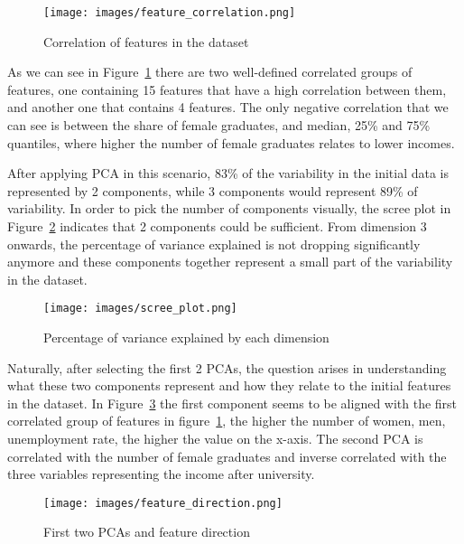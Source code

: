 \documentclass[11pt]{article}
\begin{document}
\begin{figure} [H]
    \begin{center}
        \texttt{[image: images/feature\_correlation.png]}
        \caption{Correlation of features in the dataset}
        \label{fig:featurecorrelation}
    \end{center}
\end{figure}

As we can see in Figure~\ref{fig:featurecorrelation} there are two well-defined correlated groups of features, one containing 15 features that have a high correlation between them, and another one that contains 4 features. The only negative correlation that we can see is between the share of female graduates, and median, 25\% and 75\% quantiles, where higher the number of female graduates relates to lower incomes.

After applying PCA in this scenario, 83\% of the variability in the initial data is represented by 2 components, while 3 components would represent 89\% of variability. In order to pick the number of components visually, the scree plot in Figure~\ref{fig:screeplot} indicates that 2 components could be sufficient. From dimension 3 onwards, the percentage of variance explained is not dropping significantly anymore and these components together represent a small part of the variability in the dataset.

\begin{figure} [H]
    \begin{center}
        \texttt{[image: images/scree\_plot.png]}
        \caption{Percentage of variance explained by each dimension}
        \label{fig:screeplot}
    \end{center}
\end{figure}

Naturally, after selecting the first 2 PCAs, the question arises in understanding what these two components represent and how they relate to the initial features in the dataset. In Figure~\ref{fig:featuredirection} the first component seems to be aligned with the first correlated group of features in figure~\ref{fig:featurecorrelation}, the higher the number of women, men, unemployment rate, the higher the value on the x-axis. The second PCA is correlated with the number of female graduates and inverse correlated with the three variables representing the income after university.

\begin{figure} [H]
    \begin{center}
        \texttt{[image: images/feature\_direction.png]}
        \caption{First two PCAs and feature direction}
        \label{fig:featuredirection}
    \end{center}
\end{figure}
\end{document}
